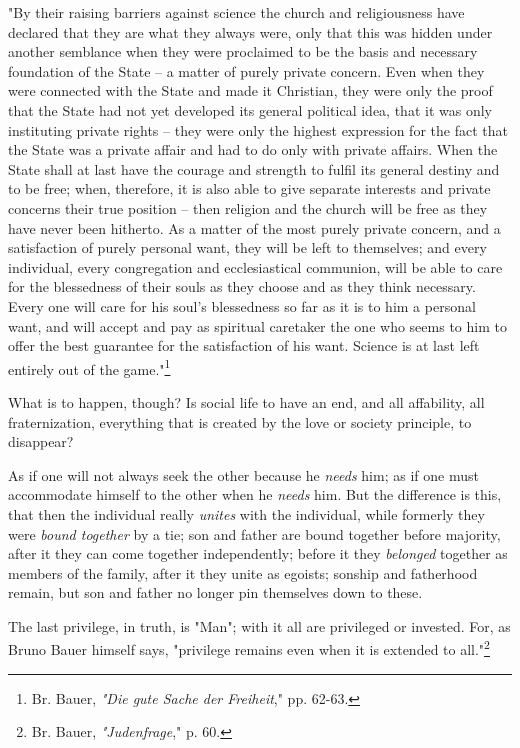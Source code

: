 \documentclass[a4paper]{book}
\begin{document}
"{}By their raising barriers against science the church and religiousness have 
declared that they are what they always were, only that this was hidden under 
another semblance when they were proclaimed to be the basis and necessary 
foundation of the State -- a matter of purely private concern. Even when they 
were connected with the State and made it Christian, they were only the proof 
that the State had not yet developed its general political idea, that it was 
only instituting private rights -- they were only the highest expression for 
the fact that the State was a private affair and had to do only with private 
affairs. When the State shall at last have the courage and strength to fulfil 
its general destiny and to be free; when, therefore, it is also able to give 
separate interests and private concerns their true position -- then religion 
and the church will be free as they have never been hitherto. As a matter of 
the most purely private concern, and a satisfaction of purely personal want, 
they will be left to themselves; and every individual, every congregation and 
ecclesiastical communion, will be able to care for the blessedness of their 
souls as they choose and as they think necessary. Every one will care for his 
soul's blessedness so far as it is to him a personal want, and will accept and 
pay as spiritual caretaker the one who seems to him to offer the best 
guarantee for the satisfaction of his want. Science is at last left entirely 
out of the game."{}\footnote{Br. Bauer, \textit{"{}Die gute Sache der 
Freiheit},"{} pp. 62-63.}

What is to happen, though? Is social life to have an end, and all affability, 
all fraternization, everything that is created by the love or society 
principle, to disappear?

As if one will not always seek the other because he \textit{needs} him; as if 
one must accommodate himself to the other when he \textit{needs} him. But the 
difference is this, that then the individual really \textit{unites} with the 
individual, while formerly they were \textit{bound together} by a tie; son and 
father are bound together before majority, after it they can come together 
independently; before it they \textit{belonged} together as members of the 
family, after it they unite as egoists; sonship and fatherhood remain, but son 
and father no longer pin themselves down to these.

The last privilege, in truth, is "{}Man"{}; with it all are privileged or 
invested. For, as Bruno Bauer himself says, "{}privilege remains even when it 
is extended to all."{}\footnote{Br. Bauer, \textit{"{}Judenfrage},"{} p. 60.}
\end{document}
